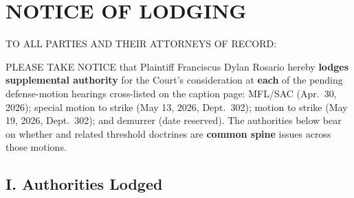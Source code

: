 \newcommand{\docshorttitle}{NTC LODGING SUPPL.\ AUTH.\ --- \S 425.17(c) CROSS-HEARING (CGC-25-631802)}
\newcommand{\doctitleblock}{NOTICE OF LODGING SUPPLEMENTAL AUTHORITY (CODE CIV.\ PROC., \S\S~425.16, 425.17)}
\newcommand{\docsubblock}{(Cal.\ Rules of Court, rule 3.1306(c); lodge only; not an amendment to any pleading)}




\section*{NOTICE OF LODGING}

TO ALL PARTIES AND THEIR ATTORNEYS OF RECORD:

PLEASE TAKE NOTICE that Plaintiff Franciscus Dylan Rosario hereby \textbf{lodges supplemental authority} for the Court's consideration at \textbf{each} of the pending defense-motion hearings cross-listed on the caption page: MFL/SAC (Apr.\ 30, 2026); special motion to strike (May 13, 2026, Dept.\ 302);  motion to strike (May 19, 2026, Dept.\ 302); and demurrer (date reserved). The authorities below bear on whether  and related threshold doctrines are \textbf{common spine} issues across those motions.

\subsection*{I. Authorities Lodged}


